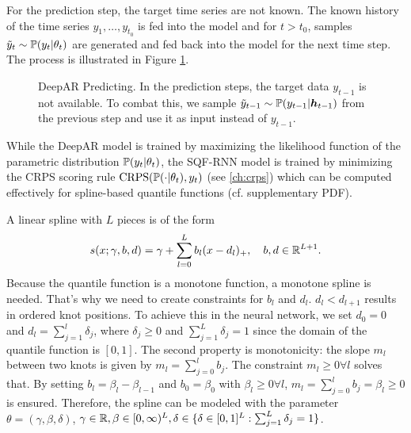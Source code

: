 For the prediction step, the target time series are not known. 
The known history of the time series \(y_1, \ldots, y_{t_0}\) is fed into the 
model and for \(t > t_0\), samples \(\tilde{y}_t \sim \P(y_t | \theta_t)\) 
are generated and fed back into the model for the next time step.
The process is illustrated in Figure \ref{fig:deepar-predicting}.

\begin{figure}[h]%
    \centering
    
    \caption[DeepAR Predicting]{DeepAR Predicting. 
    In the prediction steps, the target data \(y_{t-1}\) is not available. 
    To combat this, we sample \(\tilde{y}_{t-1} \sim \P(y_{t-1} | \boldsymbol{h}_{t-1})\) 
    from the previous step and use it as input instead of \(y_{t-1}\).}%
    \label{fig:deepar-predicting}%
\end{figure}

While the DeepAR model is trained by maximizing the likelihood function 
of the parametric distribution \(\P(y_t | \theta_t)\), 
the SQF-RNN model is trained by minimizing the CRPS scoring rule 
\(\mathrm{CRPS}(\P(\cdot | \theta_t), y_t)\) (see \ref{ch:crps}) 
which can be computed effectively for spline-based quantile functions (cf. \Textcite{Gasthaus2019} supplementary PDF).

A linear spline with \(L\) pieces is of the form 
\[ s(x; \gamma, b, d) = \gamma + \sum_{l=0}^L b_l (x - d_l)_+, 
\quad b, d \in \R^{L+1}. \]
Because the quantile function is a monotone function, 
a monotone spline is needed. That's why we need to create constraints 
for \(b_l\) and \(d_l\).
\(d_l < d_{l+1}\) results in ordered knot positions. To achieve this 
in the neural network, we set \(d_0 = 0\) and \(d_l = \sum_{j=1}^l \delta_j\), 
where \(\delta_j \geq 0\) and \(\sum_{j=1}^L \delta_j = 1\) since the domain 
of the quantile function is \([0, 1]\). 
The second property is monotonicity: the slope \(m_l\) between two knots is given by 
\(m_l = \sum_{j=0}^l b_j\). The constraint \(m_l \geq 0 \forall l\) solves that.
By setting \(b_l = \beta_l - \beta_{l-1}\) and \(b_0 = \beta_0\) with \(\beta_l \geq 0 \forall l\), 
\(m_l = \sum_{j=0}^l b_j = \beta_l \geq 0\) is ensured.
Therefore, the spline can be modeled with the parameter 
\(\theta = (\gamma, \beta, \delta)\), \(\gamma \in \R, \beta \in [0,\infty)^{L}, 
\delta \in \set{ \delta \in [0,1]^L: \sum_{j=1}^L \delta_j = 1 }\). 